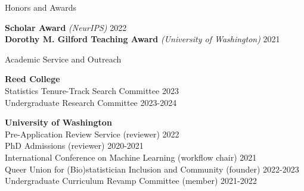 \documentclass{resume} %
\begin{document}
\begin{rSection}{Honors and Awards}

\textbf{Scholar Award} {\it (NeurIPS)} \hfill {2022}
\\ \textbf{Dorothy M. Gilford Teaching Award} {\it (University of Washington)} \hfill {2021}


\end{rSection}


\begin{rSection}{Academic Service and Outreach}

\textbf{Reed College}
\\ Statistics Tenure-Track Search Committee \hfill{2023}
\\ Undergraduate Research Committee \hfill{2023-2024}

\textbf{University of Washington}
\\ Pre-Application Review Service (reviewer) \hfill{2022}
\\ PhD Admissions (reviewer) \hfill{2020-2021}
\\ International Conference on Machine Learning (workflow chair) \hfill{2021}
\\ Queer Union for (Bio)statistician Inclusion and Community (founder) \hfill{2022-2023}
\\ Undergraduate Curriculum Revamp Committee (member) \hfill {2021-2022}

\end{rSection}
\end{document}
